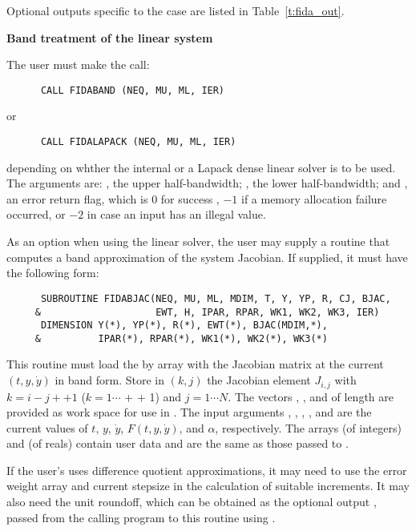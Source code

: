 \begin{Steps}
  Optional outputs specific to the {\dense} case are listed in
  Table~\ref{t:fida_out}.


  {\s} {\bf Band treatment of the linear system}
  
  The user must make the call:
\begin{verbatim}
      CALL FIDABAND (NEQ, MU, ML, IER)
\end{verbatim}
  or
\begin{verbatim}
      CALL FIDALAPACK (NEQ, MU, ML, IER)
\end{verbatim}
  depending on whther the internal
  or a Lapack dense linear solver is to be used.
  The arguments are: , the upper half-bandwidth; , 
  the lower half-bandwidth; and , an error return flag, which is  
  $0$ for success , $-1$ if a memory allocation failure occurred, or $-2$ 
  in case an input has an illegal value.     
  
  As an option when using the {\band} linear solver, the user may supply a
  routine that computes a band approximation of the system Jacobian. If supplied,
  it must have the following form:
\begin{verbatim}
      SUBROUTINE FIDABJAC(NEQ, MU, ML, MDIM, T, Y, YP, R, CJ, BJAC,
     &                    EWT, H, IPAR, RPAR, WK1, WK2, WK3, IER)
      DIMENSION Y(*), YP(*), R(*), EWT(*), BJAC(MDIM,*), 
     &          IPAR(*), RPAR(*), WK1(*), WK2(*), WK3(*)
\end{verbatim}
  This routine must load the  by  array  with the
  Jacobian matrix at the current $(t, y, \dot{y})$ in band form.  Store in
  $(k,j)$ the Jacobian element $J_{i,j}$ with $k = i - j + $$ + 1$
  ($k = 1 \cdots $ +  + 1) and $j = 1 \cdots N$. The vectors
  , , and  of length  are provided as work space
  for use in .
  The input arguments , , , , and  are the
  current values of $t$, $y$, $\dot{y}$, $F(t,y,\dot{y})$, and $\alpha$, respectively.
  The arrays  (of integers) and  (of reals) contain user data
  and are the same as those passed to .

  If the user's  uses difference quotient approximations, it
  may need to use the error weight array  and current stepsize 
  in the calculation of suitable increments.  It may also need the unit
  roundoff, which can be obtained as the optional output ,
  passed from the calling program to this routine using .


\end{Steps}
